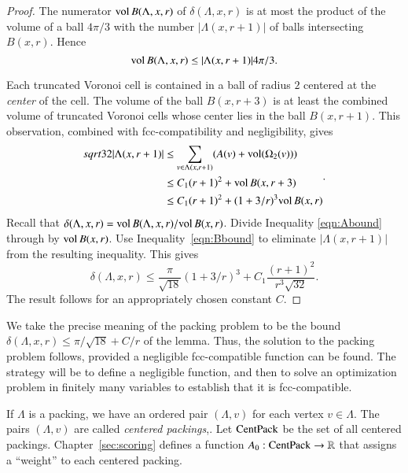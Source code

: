 \begin{proof}
The numerator ${\operatorname{vol}}\, B(\Lambda,x,r)$ of $\delta(\Lambda,x,r)$
is at most the product of the volume of a ball $4\pi/3$ with the
number $|\Lambda(x,r+1)|$ of balls intersecting $B(x,r)$.  Hence
    \begin{equation}
    {\operatorname{vol}}\, B(\Lambda,x,r) \le |\Lambda(x,r+1)| 4\pi/3.
    \label{eqn:Abound}
    \end{equation}

Each truncated Voronoi cell is contained in a ball of
radius $2$ centered at the {\it center} of the cell.  The volume
of the ball $B(x,r+3)$ is at least the combined volume of 
truncated Voronoi
cells whose center lies in the ball $B(x,r+1)$. This observation,
combined with fcc-compatibility and negligibility, gives
    \begin{equation}
    \begin{split}
    sqrt{32}|\Lambda(x,r+1)|
    &\le \sum_{v\in\Lambda(x,r+1)} (A(v) +
    {\operatorname{vol}}(\Omega_2(v))) \\
    &\le C_1 (r+1)^2 + {\operatorname{vol}}\,B(x,r+3) \\
    &\le C_1 (r+1)^2 + (1+3/r)^3 {\operatorname{vol}}\,B(x,r)
    \label{eqn:Bbound}
    \end{split}.
    \end{equation}
Recall that $\delta(\Lambda,x,r)=
{\operatorname{vol}}\,B(\Lambda,x,r)/{\operatorname{vol}}\,B(x,r)$. Divide Inequality
\ref{eqn:Abound} through by ${\operatorname{vol}}\,B(x,r)$.  Use
Inequality~\ref{eqn:Bbound} to eliminate $|\Lambda(x,r+1)|$ from the
resulting inequality.  This gives
    $$\delta(\Lambda,x,r)
        \le \frac{\pi}{\sqrt{18}} (1+3/r)^3 + C_1 \frac{(r+1)^2}{r^3\sqrt{32}}.
    $$
The result follows for an appropriately chosen constant $C$.
\end{proof}

\begin{remark} \label{remark:precise}
We take the precise meaning of the packing problem to be the
bound $\delta(\Lambda,x,r) \le \pi/\sqrt{18} + C/r$ of the lemma.
Thus, the solution to the packing problem follows, provided a negligible
fcc-compatible function can be found. The strategy will be to
define a negligible function, and then to solve an optimization
problem in finitely many variables to establish that it is
fcc-compatible.
\end{remark}

If $\Lambda$ is a %
packing, we have an ordered pair
$(\Lambda,v)$ for each vertex $v\in\Lambda$.  The pairs
$(\Lambda,v)$ are called {\it centered packings},.
Let ${\operatorname{CentPack}}$ be the set of all centered packings.
%
Chapter~\ref{sec:scoring} defines a function
$A_0:{\operatorname{CentPack}}\to\mathbb{R}$ that assigns a ``weight'' to each
centered packing.


